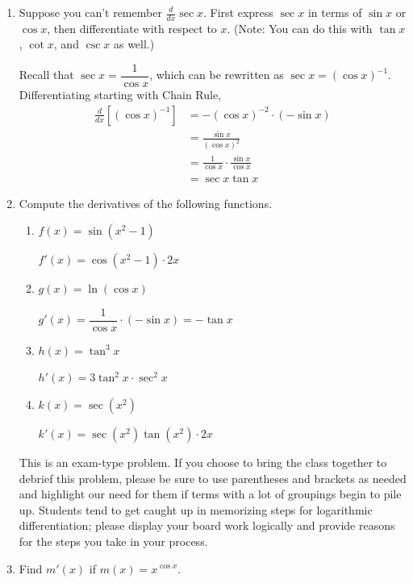 \documentclass{article}
\begin{document}
  \begin{enumerate}
\item Suppose you can't remember $\frac{d}{dx} \sec x$. First express $\sec x$ in terms of $\sin x$ or $\cos x$, then differentiate with respect to $x$. (Note: You can do this with $\tan x$, $\cot x$, and $\csc x$ as well.)

\begin{solution}
Recall that $\sec x = \dfrac{1}{\cos x}$, which can be rewritten as $\sec x =(\cos x)^{-1}$. Differentiating starting with Chain Rule,
\begin{align*}
\frac{d}{dx}\left[(\cos x)^{-1}\right]&=-(\cos x)^{-2}\cdot(-\sin x)\\
&=\frac{\sin x}{(\cos x)^{2}}\\
&=\frac{1}{\cos x} \cdot \frac{\sin x}{\cos x}\\
&=\sec x \tan x
\end{align*}
\end{solution}
\vfill\vfill
  \item Compute the derivatives of the following functions.
  \begin{enumerate}

    \item $f(x)=\sin(x^2-1)$
    
    \begin{solution}
        $f'(x)=\cos(x^2-1)\cdot2x$
    \end{solution}
    
    \vfill
    
    \item $g(x)=\ln (\cos x)$
    
    \begin{solution}
        $g'(x)=\dfrac{1}{\cos x}\cdot(-\sin x)=-\tan x$
    \end{solution}
    
    \vfill
    \item $h(x)=\tan^3 x$ 
    
    \begin{solution}
        $h'(x)=3\tan^2 x\cdot \sec ^2 x$
    \end{solution}
    \vfill
    \item $k(x)= \sec(x^2)$
    
    \begin{solution}
        $k'(x)=\sec(x^2)\tan(x^2)\cdot2x$
    \end{solution}
    \vfill

    \end{enumerate}
\newpage
\begin{workshop}
    This is an exam-type problem. If you choose to bring the class together to debrief this problem, please be sure to use parentheses and brackets as needed and highlight our need for them if terms with a lot of groupings begin to pile up. Students tend to get caught up in memorizing steps for logarithmic differentiation; please display your board work logically and provide reasons for the steps you take in your process.
\end{workshop}
\item Find $m'(x)$ if $m(x)=x^{\cos x}$. 


\end{enumerate}
\end{document}
